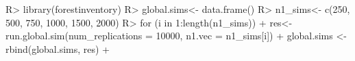 \documentclass[article]{jss}
\begin{document}
  
  
    
\newpage
  

\begin{Schunk}
\begin{Sinput}
R> library(forestinventory)
R> global.sims<- data.frame()
R> n1_sims<- c(250, 500, 750, 1000, 1500, 2000) 
R>   for (i in 1:length(n1_sims)){
+      res<- run.global.sim(num_replications = 10000, n1.vec = n1_sims[i])
+      global.sims <- rbind(global.sims, res)
+    }
\end{Sinput}
\end{Schunk}

  
  

  
  
  
  
  
  
  
\newpage






\end{document}
